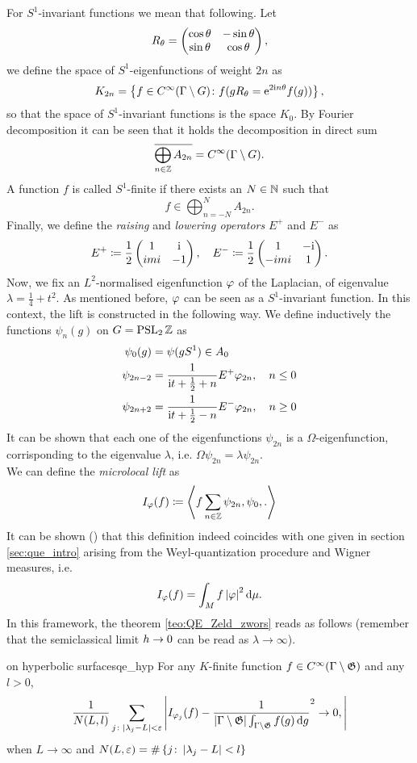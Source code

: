 For $S^{1}$-invariant functions we mean that following. Let 
\[
R_{\theta}=\begin{pmatrix} \cos\theta&-\sin\theta\\
\sin\theta&\cos\theta \end{pmatrix},
\]
we define the space of $S^{1}$-eigenfunctions of weight $2n$ as 
\[
K_{2n}=\left\{
f\in C^{\infty}(\Gamma\setminus G)\colon f(gR_{\theta}=\mathrm{e}^{2\mathrm{i} n\theta}f(g))
\right\},
\]
so that the space of $S^{1}$-invariant functions is the space $K_{0}$. By Fourier decomposition it can be seen that it holds the decomposition in direct sum
\[
\overline{\bigoplus_{n\in\mathbb{Z}}A_{2n}}=C^{\infty}(\Gamma\setminus G).
\]
A function $f$ is called $S^{1}$-finite if there exists an $N\in\mathbb{N}$ such that 
\[
f\in\bigoplus_{n=-N}^{N}A_{2n}.
\]
Finally, we define the \emph{raising} and \emph{lowering operators} $E^{+}$ and $E^{-}$ as
\[
E^{+}\coloneqq\frac{1}{2}\begin{pmatrix} 1&\mathrm{i}\\imi&-1 \end{pmatrix},\quad
E^{-}\coloneqq\frac{1}{2}\begin{pmatrix} 1&-\mathrm{i}\\-imi&1 \end{pmatrix}.
\]
Now, we fix an $L^{2}$-normalised eigenfunction $\varphi$ of the Laplacian, of eigenvalue $\lambda=\frac{1}{4}+t^{2}$. As mentioned before, $\varphi$ can be seen as a $S^{1}$-invariant function. In this context, the lift is constructed in the following way. We define inductively the functions $\psi_{n}(g)$ on $G=\operatorname{PSL}_{2}\mathbb{Z}$ as
\begin{align*}
\psi_{0}(g)&=\psi(gS^{1})\in A_{0}\\
\psi_{2n-2}&=\frac{1}{\mathrm{i} t+\frac{1}{2}+n}E^{+}\varphi_{2n},\quad n\leq0\\
\psi_{2n+2}&=\frac{1}{\mathrm{i} t+\frac{1}{2}-n}E^{-}\varphi_{2n},\quad n\geq0 
\end{align*}
It can be shown that each one of the eigenfunctions $\psi_{2n}$ is a $\Omega$-eigenfunction, corrisponding to the eigenvalue $\lambda$, i.e. $\Omega\psi_{2n}=\lambda\psi_{2n}$.\\ 
We can define the \emph{microlocal lift} as 
\[
I_{\varphi}(f)\coloneqq\left< f\sum_{n\in\mathbb{Z}}\psi_{2n},\psi_{0},.\right>
\]
It can be shown (\cite{Zeld:article}) that this definition indeed coincides with one given in section \ref{sec:que_intro} arising from the Weyl-quantization procedure and Wigner measures, i.e.
\[
I_{\varphi}(f)=\int_{M}f\left| \varphi\right|^{2}\mathop{}\!\mathrm{d}\mu.
\]
In this framework, the \QE theorem \ref{teo:QE_Zeld_zwors} reads as follows (remember that the semiclassical limit $h\to0$ can be read as $\lambda\to\infty$).

\begin{impTeo}{\QE on hyperbolic surfaces}{qe_hyp}
For any $K$-finite function $f\in C^{\infty}(\Gamma\setminus\mathfrak{G})$ and any $l>0$,
\[
\frac{1}{N(L,l)}\sum_{j\colon\left| \lambda_{j}-L\right|<\varepsilon}\left| 
I_{\varphi_{j}}(f)-\frac{1}{\left| \Gamma\setminus\mathfrak{G}\right|\int_{\Gamma\setminus\mathfrak{G}}f(g)\mathop{}\!\mathrm{d} g}^{2}\to0,
\right|
\]
when $L\to\infty$ and $N(L,\varepsilon)=\#\left\{j\colon\left| \lambda_{j}-L\right|<l\right\}$
\end{impTeo}

